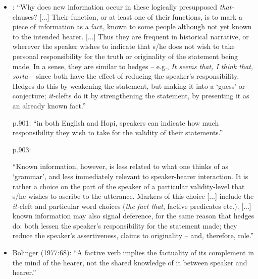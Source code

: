 \documentclass[11pt,fleqn]{article}
\newcommand{\6}{\mbox{$[\hspace*{-.6mm}[$}}
\newcommand{\9}{\mbox{$]\hspace*{-.6mm}]$}}
\begin{document}
\begin{itemize}
\begin{itemize}
\item \citealt[899]{prince1978}: ``Why does new information occur in these logically presupposed {\em that-}clauses? [...] Their function, or at least one of their functions, is to mark a piece of information as a fact, known to some people although not yet known to the intended hearer. [...] Thus they are frequent in historical narrative, or wherever the speaker wishes to indicate that s/he does not wish to take personal responsibility for the truth or originality of the statement being made. In a sense, they are similar to hedges -- e.g., {\em It seems that, I think that, sorta} -- since both have the effect of reducing the speaker's responsibility. Hedges do this by weakening the statement, but making it into a `guess' or conjecture; {\em it-}clefts do it by strengthening the statement, by presenting it as an already known fact.''

p.901: ``in both English and Hopi, speakers can indicate how much responsibility they wish to take for the validity of their statements.''

p.903:

\begin{exe}
\ex
{}
\end{exe}

``Known information, however, is less related to what one thinks of as `grammar', and less immediately relevant to speaker-hearer interaction. It is rather a choice on the part of the speaker of a particular validity-level that s/he wishes to ascribe to the utterance. Markers of this choice [...] include the {\em it-}cleft and particular word choices ({\em the fact that}, factive predicates etc.). [...] known information may also signal deference, for the same reason that hedges do: both lessen the speaker's responsibility for the statement made; they reduce the speaker's assertiveness, claims to originality -- and, therefore, role.''

\item Bolinger (1977:68): ``A factive verb implies the factuality of its complement in the mind of the hearer, not the shared knowledge of it between speaker and hearer.''


\end{itemize}
\end{itemize}
\end{document}
